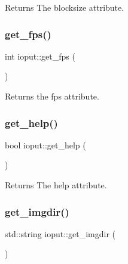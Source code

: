 \begin{DoxyReturn}{Returns}
The blocksize attribute. 
\end{DoxyReturn}
\mbox{\label{classioput_ad57f6282c14f07f221185e73d9d2889d}} 
\subsubsection{\texorpdfstring{get\+\_\+fps()}{get\_fps()}}
{\footnotesize\ttfamily int ioput\+::get\+\_\+fps (\begin{DoxyParamCaption}{ }\end{DoxyParamCaption})\hspace{0.3cm}{\ttfamily [inline]}}

\begin{DoxyReturn}{Returns}
the fps attribute. 
\end{DoxyReturn}
\mbox{\label{classioput_ad6cd7eba7190641dca05acdef9d4e959}} 
\subsubsection{\texorpdfstring{get\+\_\+help()}{get\_help()}}
{\footnotesize\ttfamily bool ioput\+::get\+\_\+help (\begin{DoxyParamCaption}{ }\end{DoxyParamCaption})\hspace{0.3cm}{\ttfamily [inline]}}

\begin{DoxyReturn}{Returns}
The help attribute. 
\end{DoxyReturn}
\mbox{\label{classioput_a25f843ebe6f2f29ca45470d4b02c1389}} 
\subsubsection{\texorpdfstring{get\+\_\+imgdir()}{get\_imgdir()}}
{\footnotesize\ttfamily std\+::string ioput\+::get\+\_\+imgdir (\begin{DoxyParamCaption}{ }\end{DoxyParamCaption})\hspace{0.3cm}{\ttfamily [inline]}}

